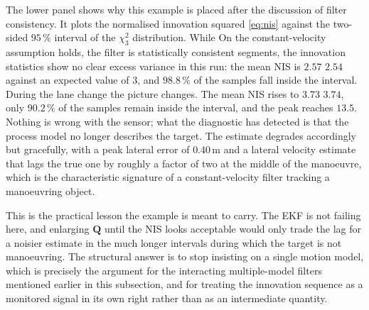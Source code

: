 \documentclass[graybox,envcountchap]{style/SNmono}
\providecommand{\DIFadd}[1]{{\protect\color{blue} #1}} %
\providecommand{\DIFdel}[1]{{\protect\color{red} #1}} %
\providecommand{\DIFaddbegin}{} %
\providecommand{\DIFaddend}{} %
\providecommand{\DIFdelbegin}{} %
\providecommand{\DIFdelend}{} %
\begin{document}
\begin{example}
The lower panel shows why this example is placed after the discussion of filter
consistency. It plots the normalised innovation squared \eqref{eq:nis} against
the two-sided $95\,\%$ interval of the $\chi^{2}_{3}$ distribution. \DIFdelbegin \DIFdel{While }\DIFdelend \DIFaddbegin \DIFadd{On }\DIFaddend the
constant-velocity \DIFdelbegin \DIFdel{assumption holds, the filter is statistically consistent}\DIFdelend \DIFaddbegin \DIFadd{segments, the innovation statistics show no clear excess variance in this run}\DIFaddend : the
mean NIS is \DIFdelbegin \DIFdel{$2.57$ }\DIFdelend \DIFaddbegin \DIFadd{$2.54$ }\DIFaddend against an expected value of $3$, and $98.8\,\%$ of the
samples fall inside the interval. During the lane change the picture changes.
The mean NIS rises to \DIFdelbegin \DIFdel{$3.73$}\DIFdelend \DIFaddbegin \DIFadd{$3.74$}\DIFaddend , only $90.2\,\%$ of the samples remain inside the
interval, and the peak reaches $13.5$. Nothing is wrong with the sensor; what
the diagnostic has detected is that the process model no longer describes the
target. The estimate degrades accordingly but gracefully, with a peak lateral
error of $0.40$\,m and a lateral velocity estimate that lags the true one by
roughly a factor of two at the middle of the manoeuvre, which is the
characteristic signature of a constant-velocity filter tracking a manoeuvring
object.

This is the practical lesson the example is meant to carry. The EKF is not
failing here, and enlarging $\mathbf{Q}$ until the NIS looks acceptable would
only trade the lag for a noisier estimate in the much longer intervals during
which the target is not manoeuvring. The structural answer is to stop insisting
on a single motion model, which is precisely the argument for the interacting
multiple-model filters mentioned earlier in this subsection, and for treating
the innovation sequence as a monitored signal in its own right rather than as an
intermediate quantity.
\end{example}
\end{document}

